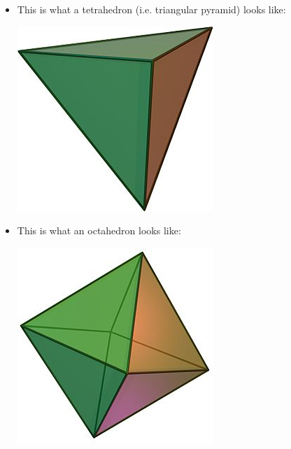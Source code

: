 \documentclass[letterpaper]{article}
\begin{document}
\begin{itemize}
    \item This is what a tetrahedron (i.e. triangular pyramid) looks like: 
    \begin{center}
        \includegraphics[scale=0.3]{assets/tetra.jpg}
    \end{center}

    \item This is what an octahedron looks like: 
    \begin{center}
        \includegraphics[scale=0.3]{assets/octo.jpg}
    \end{center}
    

\end{itemize}
\end{document}
